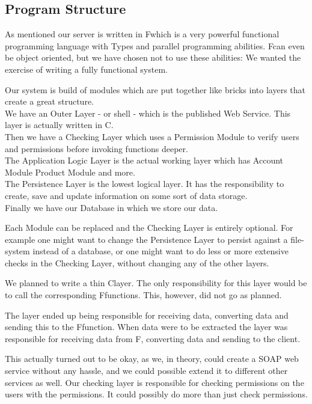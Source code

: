\subsection{Program Structure}
As mentioned our server is written in F\Sh which is a very powerful functional programming language with Types and parallel programming abilities. F\Sh can even be object oriented, but we have chosen not to use these abilities: We wanted the exercise of writing a fully functional system.

Our system is build of modules which are put together like bricks into layers that create a great structure.
\\We have an Outer Layer - or shell - which is the published Web Service. This layer is actually written in C\Sh.
\\Then we have a Checking Layer which uses a Permission Module to verify users and permissions before invoking functions deeper.
\\The Application Logic Layer is the actual working layer which has Account Module Product Module and more.
\\The Persistence Layer is the lowest logical layer. It has the responsibility to create, save and update information on some sort of data storage.
\\Finally we have our Database in which we store our data.

Each Module can be replaced and the Checking Layer is entirely optional. For example one might want to change the Persistence Layer to persist against a file-system instead of a database, or one might want to do less or more extensive checks in the Checking Layer, without changing any of the other layers.

We planned to write a thin C\Sh layer. The only responsibility for this layer would be to call the corresponding F\Sh functions. This, however, did not go as planned.

The layer ended up being responsible for receiving data, converting data and sending this to the F\Sh function. When data were to be extracted the layer was responsible for receiving data from F\Sh, converting data and sending to the client.

This actually turned out to be okay, as we, in theory, could create a SOAP web service without any hassle, and we could possible extend it to different other services as well.
Our checking layer is responsible for checking permissions on the users with the permissions. It could possibly do more than just check permissions.

